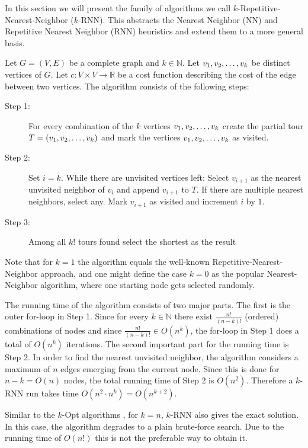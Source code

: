 In this section we will present the family of algorithms we call $k$-Repetitive-Nearest-Neighbor ($k$-RNN). 
This abstracts the Nearest Neighbor (NN) and Repetitive Nearest Neighbor (RNN) heuristics and extend them to a more general basis.

Let $G = (V, E)$ be a complete graph and $k \in \mathbb{N}$. Let $v_1, v_2, \mathellipsis, v_k$ be distinct vertices of $G$. 
Let $c: V \times V \rightarrow \mathbb{R}$ be a cost function describing the cost of the edge between two vertices. 
The algorithm consists of the following steps:


\begin{description}
	\item[Step 1:] For every combination of the $k$ vertices $v_1, v_2, \mathellipsis, v_k$ create the partial tour $T = (v_1, v_2, \mathellipsis, v_k)$ and mark the vertices $v_1, v_2, \mathellipsis, v_k$ as visited.
	
	\item[Step 2:] Set $i = k$. While there are unvisited vertices left: 
	Select $v_{i+1}$ as the nearest unvisited neighbor of $v_i$ and append $v_{i+1}$ to $T$. 
	If there are multiple nearest neighbors, select any.
	Mark $v_{i+1}$ as visited and increment $i$ by $1$.
	
	\item[Step 3:] Among all $k!$ tours found select the shortest as the result
\end{description}	

Note that for $k = 1$ the algorithm equals the well-known Repetitive-Nearest-Neighbor approach, and one might define the case $k = 0$ as the popular Nearest-Neighbor algorithm, where one starting node gets selected randomly.

The running time of the algorithm consists of two major parts. 
The first is the outer for-loop in Step 1. 
Since for every $k \in \mathbb{N}$ there exist $\frac{n!}{(n-k)!}$ (ordered) combinations of nodes and since $\frac{n!}{(n-k)!} \in O(n^k)$, the for-loop in Step 1 does a total of $O(n^k)$ iterations.
The second important part for the running time is Step 2. In order to find the nearest unvisited neighbor, the algorithm considers a maximum of $n$ edges emerging from the current node. 
Since this is done for $n - k = O(n)$ nodes, the total running time of Step 2 is $O(n^2)$.
Therefore a $k$-RNN run takes time $O(n^2 \cdot n^k) = O(n^{k+2})$.

Similar to the $k$-Opt algorithms \cite{CROES1958, LIN1973}, for $k = n$, $k$-RNN also gives the exact solution. In this case, the algorithm degrades to a plain brute-force search.
Due to the running time of $O(n!)$ this is not the preferable way to obtain it.

